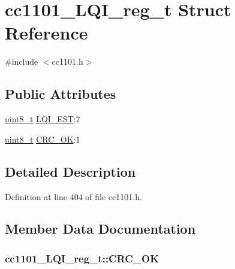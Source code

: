 \hypertarget{structcc1101___l_q_i__reg__t}{}\section{cc1101\+\_\+\+L\+Q\+I\+\_\+reg\+\_\+t Struct Reference}
\label{structcc1101___l_q_i__reg__t}


{\ttfamily \#include $<$cc1101.\+h$>$}

\subsection*{Public Attributes}
\begin{DoxyCompactItemize}
\item 
\hyperlink{_p_e___types_8h_aba7bc1797add20fe3efdf37ced1182c5}{uint8\+\_\+t} \hyperlink{structcc1101___l_q_i__reg__t_a646061d4c2439531316cf0d1e6a89174}{L\+Q\+I\+\_\+\+E\+ST}\+:7
\item 
\hyperlink{_p_e___types_8h_aba7bc1797add20fe3efdf37ced1182c5}{uint8\+\_\+t} \hyperlink{structcc1101___l_q_i__reg__t_a97fdf1ca4f1745530b7444e49d76cad5}{C\+R\+C\+\_\+\+OK}\+:1
\end{DoxyCompactItemize}


\subsection{Detailed Description}


Definition at line 404 of file cc1101.\+h.



\subsection{Member Data Documentation}
\subsubsection[{\texorpdfstring{C\+R\+C\+\_\+\+OK}{CRC_OK}}]{ cc1101\+\_\+\+L\+Q\+I\+\_\+reg\+\_\+t\+::\+C\+R\+C\+\_\+\+OK}\hypertarget{structcc1101___l_q_i__reg__t_a97fdf1ca4f1745530b7444e49d76cad5}{}\label{structcc1101___l_q_i__reg__t_a97fdf1ca4f1745530b7444e49d76cad5}


